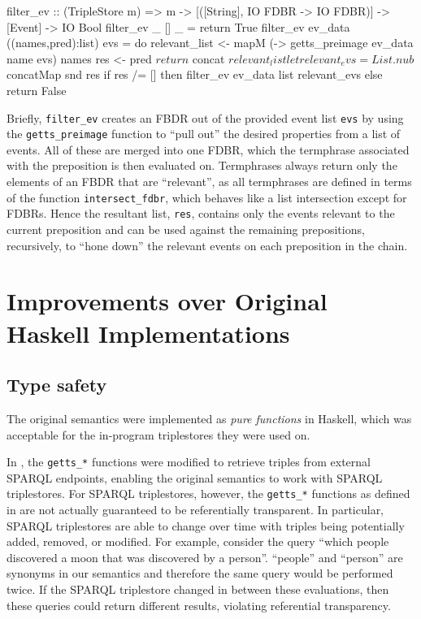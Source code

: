 \documentclass[../main.tex]{subfiles}
\begin{document}
\begin{code}
filter_ev :: (TripleStore m) => m -> [([String], IO FDBR -> IO FDBR)] -> [Event] -> IO Bool
filter_ev _ [] _ = return True
filter_ev ev_data ((names,pred):list) evs = do
relevant_list <- mapM (\name -> getts_preimage ev_data name evs) names
res <- pred $ return $ concat $ relevant_list
let relevant_evs = List.nub $ concatMap snd res
if res /= [] then filter_ev ev_data list relevant_evs else return False
\end{code}

Briefly, \texttt{filter\_ev} creates an FBDR out of the provided event list \texttt{evs} by using the \texttt{getts\_preimage} function
to ``pull out'' the desired properties from a list of events.  All of these are merged into one FDBR,
which the termphrase associated with the preposition is then evaluated on.  Termphrases always return only the elements of an FBDR that are ``relevant'',
as all termphrases are defined in terms of the function \texttt{intersect\_fdbr}, which behaves like a list intersection except for FDBRs.
Hence the resultant list, \texttt{res}, contains only the events relevant to the current preposition and can be used against the remaining prepositions, recursively, to ``hone down'' the relevant events on each preposition in the chain.

\section{Improvements over Original Haskell Implementations}

\subsection{Type safety}

The original semantics were implemented as {\em pure functions} in Haskell, which was acceptable for the in-program triplestores they were used on.

In \cite{agboola2015extensible}, the \texttt{getts\_*} functions were modified to retrieve triples from external SPARQL endpoints, enabling the original
semantics to work with SPARQL triplestores.  For SPARQL triplestores, however, the \texttt{getts\_*} functions as defined in \cite{agboola2015extensible} are not actually guaranteed to be referentially transparent. In particular, SPARQL triplestores are able to change over time with triples being potentially added, removed, or modified.
For example, consider the query ``which people discovered a moon that was discovered by a person''.
``people'' and ``person'' are synonyms in our semantics and therefore the same query would be performed twice.  If the SPARQL triplestore changed in between these evaluations,
then these queries could return different results, violating referential transparency.
\end{document}

